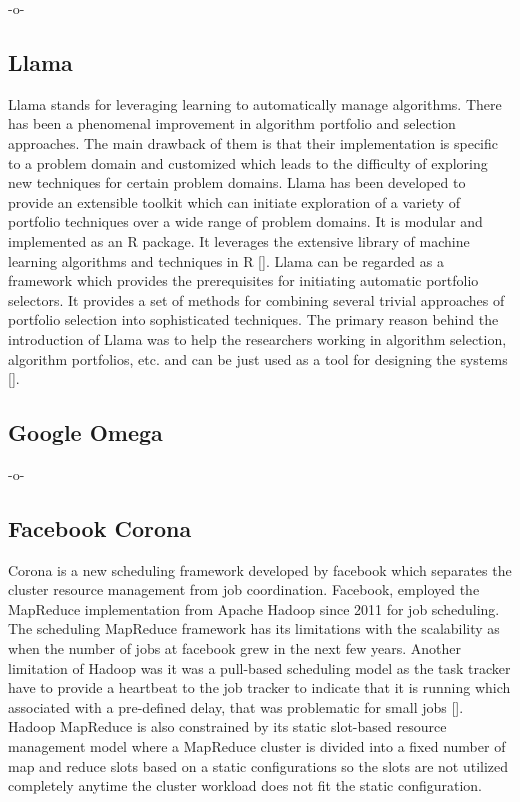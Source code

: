      -o-
      
\subsection{Llama}

Llama stands for leveraging learning to automatically manage
algorithms. There has been a phenomenal improvement in algorithm
portfolio and selection approaches. The main drawback of them is that
their implementation is specific to a problem domain and customized
which leads to the difficulty of exploring new techniques for certain
problem domains. Llama has been developed to provide an extensible
toolkit which can initiate exploration of a variety of portfolio
techniques over a wide range of problem domains. It is modular and
implemented as an R package. It leverages the extensive library of
machine learning algorithms and techniques in R [\cite{lla1}]. Llama can
be regarded as a framework which provides the prerequisites for
initiating automatic portfolio selectors. It provides a set of methods
for combining several trivial approaches of portfolio selection into
sophisticated techniques. The primary reason behind the introduction
of Llama was to help the researchers working in algorithm selection,
algorithm portfolios, etc. and can be just used as a tool for
designing the systems [\cite{lla1}].
     
\subsection{Google Omega}

-o- 

\subsection{Facebook Corona}

Corona is a new scheduling framework developed by facebook which
separates the cluster resource management from job coordination.
Facebook, employed the MapReduce implementation from Apache Hadoop
since 2011 for job scheduling. The scheduling MapReduce framework has
its limitations with the scalability as when the number of jobs at
facebook grew in the next few years. Another limitation of Hadoop was
it was a pull-based scheduling model as the task tracker have to
provide a heartbeat to the job tracker to indicate that it is running
which associated with a pre-defined delay, that was problematic for
small jobs [\cite{www-facebook-corona}]. Hadoop MapReduce is also
constrained by its static slot-based resource management model where a
MapReduce cluster is divided into a fixed number of map and reduce
slots based on a static configurations so the slots are not utilized
completely anytime the cluster workload does not fit the static
configuration.

